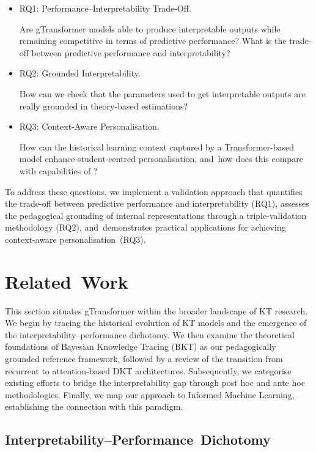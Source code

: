 \documentclass[applsci,article,accept,moreauthors,pdftex]{Definitions/mdpi}
\begin{document}
\begin{itemize}
\item RQ1: Performance--Interpretability Trade-Off.

Are gTransformer models able to produce interpretable outputs while remaining competitive in terms of predictive performance? What is the trade-off between predictive performance and interpretability?

\item RQ2: Grounded Interpretability.

How can we check that the parameters used to get interpretable outputs are really grounded in theory-based estimations?  

\item RQ3: Context-Aware Personalisation.

How can the historical learning context captured by a Transformer-based model enhance student-centred personalisation, and~how does this compare with capabilities of ?

\end{itemize}


{To address these questions, we implement a validation approach that quantifies the trade-off between predictive performance and interpretability (RQ1), assesses the pedagogical grounding of internal representations through a triple-validation methodology (RQ2), and~demonstrates practical applications for achieving context-aware personalisation~(RQ3).}


\section{Related~Work} \label{sec_related}

{This section situates gTransformer within the broader landscape of KT research. We begin by tracing the historical evolution of KT models and the emergence of the interpretability--performance dichotomy. We then examine the theoretical foundations of Bayesian Knowledge Tracing (BKT) as our pedagogically grounded reference framework, followed by a review of the transition from recurrent to attention-based DKT architectures. Subsequently, we categorise existing efforts to bridge the interpretability gap through post hoc and ante hoc methodologies. Finally, we map our approach to Informed Machine Learning, establishing the connection with this paradigm.}


\subsection{Interpretability--Performance~Dichotomy} \label{sec_dichotomy}
\end{document}
